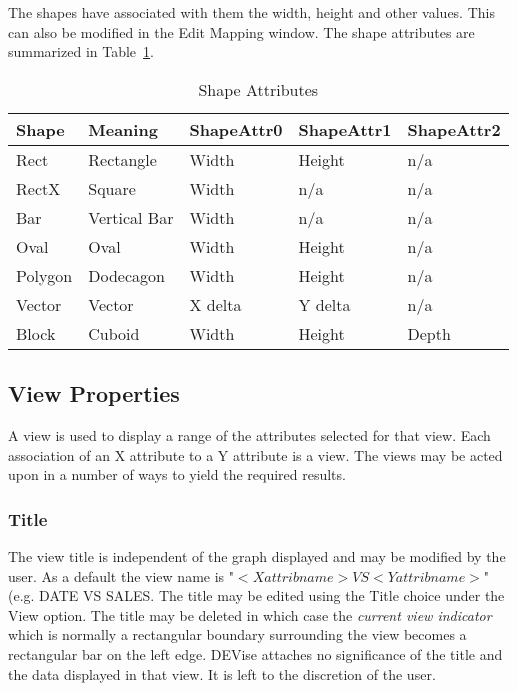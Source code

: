 The shapes have associated with them the width, height and other
values. This can also be modified in the Edit Mapping window. The
shape attributes are summarized in Table~\ref{shapeattrs}.

\begin{table}[htbp]
\begin{center}
\caption{Shape Attributes\label{shapeattrs}}
\bigskip
\begin{tabular}{l|l|l|l|l}
Shape   & Meaning      & ShapeAttr0 & ShapeAttr1 & ShapeAttr2 \\
\hline
Rect    & Rectangle    & Width      & Height     & n/a \\
RectX   & Square       & Width      & n/a        & n/a \\
Bar     & Vertical Bar & Width      & n/a        & n/a \\
Oval    & Oval         & Width      & Height     & n/a \\
Polygon & Dodecagon    & Width      & Height     & n/a \\  
Vector  & Vector       & X delta    & Y delta    & n/a \\
Block   & Cuboid       & Width      & Height     & Depth
\end{tabular}
\end{center}
\end{table}


\subsection{View Properties}

A view is used to display a range of the attributes selected for that
view. Each association of an X attribute to a Y attribute is a
view. The views may be acted upon in a number of ways to yield the
required results.

\subsubsection{Title}

The view title is independent of the graph displayed and may be
modified by the user. As a default the view name is "$<X attrib name>
VS <Y attrib name>$" (e.g. DATE VS SALES. The title may be edited
using the Title choice under the View option.  The title may be
deleted in which case the {\em current view indicator} which is
normally a rectangular boundary surrounding the view becomes a
rectangular bar on the left edge. DEVise attaches no significance of
the title and the data displayed in that view. It is left to the
discretion of the user.

